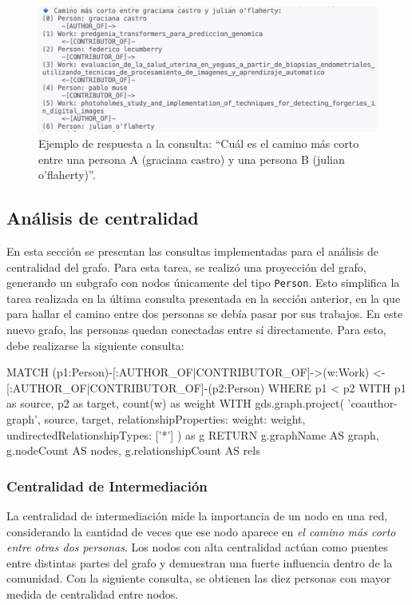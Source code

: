 \documentclass[journal]{IEEEtran}
\begin{document}
\begin{figure}[b]
	\centering
	\includegraphics[width=\linewidth]{imagenes/camino_corto.png}
	\caption{Ejemplo de respuesta a la consulta: ``Cuál es el camino más corto entre una persona A (graciana castro) y una persona B (julian o'flaherty)''.}
	\label{fig:camino_corto}
\end{figure}

\subsection{Análisis de centralidad}
En esta sección se presentan las consultas implementadas para el análisis de centralidad del grafo. Para esta tarea, se realizó una proyección del grafo, generando un subgrafo con nodos únicamente del tipo \texttt{Person}. Esto simplifica la tarea realizada en la última consulta presentada en la sección anterior, en la que para hallar el camino entre dos personas se debía pasar por sus trabajos. En este nuevo grafo, las personas quedan conectadas entre sí directamente. Para esto, debe realizarse la siguiente consulta:

\begin{sflisting}[style=sparql,caption= Consulta para obtener la proyección del grafo de personas,label=subgrafo]
	MATCH (p1:Person)-[:AUTHOR_OF|CONTRIBUTOR_OF]->(w:Work)
	<-[:AUTHOR_OF|CONTRIBUTOR_OF]-(p2:Person)
	WHERE p1 < p2
	WITH p1 as source, p2 as target, count(w) as weight
	WITH gds.graph.project(
	'coauthor-graph',
	source,
	target,
	{relationshipProperties: {weight: weight}},
	{undirectedRelationshipTypes: ['*']}
	) as g
	RETURN g.graphName AS graph, g.nodeCount
	AS nodes, g.relationshipCount AS rels
\end{sflisting}

\subsubsection{Centralidad de Intermediación}

La centralidad de intermediación mide la importancia de un nodo en una red, considerando la cantidad de veces que ese nodo aparece en \textit{el camino más corto entre otras dos personas}. Los nodos con alta centralidad actúan como puentes entre distintas partes del grafo y demuestran una fuerte influencia dentro de la comunidad. Con la siguiente consulta, se obtienen las diez personas con mayor medida de centralidad entre nodos.
\end{document}
